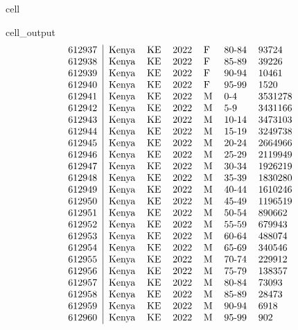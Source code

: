 \documentclass[letterpaper,10pt,english]{jupyterBook}
\begin{document}
\begin{sphinxuseclass}{cell}
\begin{sphinxVerbatimOutput}
\begin{sphinxuseclass}{cell_output}
\begin{equation*}
\begin{split}
\begin{tabular}{r|llllll}
	612937 & Kenya & KE & 2022 & F & 80-84 &   93724\\
	612938 & Kenya & KE & 2022 & F & 85-89 &   39226\\
	612939 & Kenya & KE & 2022 & F & 90-94 &   10461\\
	612940 & Kenya & KE & 2022 & F & 95-99 &    1520\\
	612941 & Kenya & KE & 2022 & M & 0-4   & 3531278\\
	612942 & Kenya & KE & 2022 & M & 5-9   & 3431166\\
	612943 & Kenya & KE & 2022 & M & 10-14 & 3473103\\
	612944 & Kenya & KE & 2022 & M & 15-19 & 3249738\\
	612945 & Kenya & KE & 2022 & M & 20-24 & 2664966\\
	612946 & Kenya & KE & 2022 & M & 25-29 & 2119949\\
	612947 & Kenya & KE & 2022 & M & 30-34 & 1926219\\
	612948 & Kenya & KE & 2022 & M & 35-39 & 1830280\\
	612949 & Kenya & KE & 2022 & M & 40-44 & 1610246\\
	612950 & Kenya & KE & 2022 & M & 45-49 & 1196519\\
	612951 & Kenya & KE & 2022 & M & 50-54 &  890662\\
	612952 & Kenya & KE & 2022 & M & 55-59 &  679943\\
	612953 & Kenya & KE & 2022 & M & 60-64 &  488074\\
	612954 & Kenya & KE & 2022 & M & 65-69 &  340546\\
	612955 & Kenya & KE & 2022 & M & 70-74 &  229912\\
	612956 & Kenya & KE & 2022 & M & 75-79 &  138357\\
	612957 & Kenya & KE & 2022 & M & 80-84 &   73093\\
	612958 & Kenya & KE & 2022 & M & 85-89 &   28473\\
	612959 & Kenya & KE & 2022 & M & 90-94 &    6918\\
	612960 & Kenya & KE & 2022 & M & 95-99 &     902\\
\end{tabular}\end{split}
\end{equation*}
\end{sphinxuseclass}\end{sphinxVerbatimOutput}

\end{sphinxuseclass}
\sphinxAtStartPar
\end{document}
